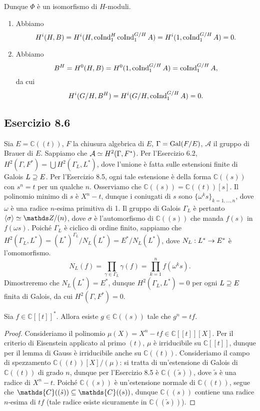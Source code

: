 \documentclass[a4paper]{article}
\newcommand*{\CC}{\mathds{C}}
\begin{document}
Dunque $\Phi$ è un isomorfismo di $H$-moduli.
\begin{enumerate}[(1)]
\item Abbiamo
$$
H^i(H,B)=H^i(H,\operatorname{coInd}_1^H\operatorname{coInd}_1^{G/H}A)=H^i(1,\operatorname{coInd}_1^{G/H}A)=0.
$$
\item Abbiamo
$$
B^H=H^0(H,B)=H^0(1,\operatorname{coInd}_1^{G/H}A)=\operatorname{coInd}_1^{G/H}A,
$$
da cui
$$
H^i(G/H,B^H)=H^i(G/H,\operatorname{coInd}_1^{G/H}A)=0.
$$
\end{enumerate}

\subsection*{Esercizio 8.6}
Sia $E=\CC((t))$, $F$ la chiusura algebrica di $E$, $\Gamma=\operatorname{Gal}(F/E)$, $\mathcal{A}$ il gruppo di Brauer di $E$. Sappiamo che $\mathcal{A}\simeq H^2(\Gamma,F^*)$. Per l'Esercizio 6.2, $H^2(\Gamma, F^*)=\bigcup H^2(\Gamma_L,L^*)$, dove l'unione è fatta sulle estensioni finite di Galois $L\supseteq E$. Per l'Esercizio 8.5, ogni tale estensione è della forma $\CC((s))$ con $s^n=t$ per un qualche $n$. Osserviamo che $\CC((s))=\CC((t))[s]$. Il polinomio minimo di $s$ è $X^n-t$, dunque i coniugati di $s$ sono $\{\omega^ks\}_{k=1,\ldots,n}$, dove $\omega$ è una radice $n$-esima primitiva di 1. Il gruppo di Galois $\Gamma_L$ è pertanto $\langle\sigma\rangle\iso\ZZ/(n)$, dove $\sigma$ è l'automorfismo di $\CC((s))$ che manda $f(s)$ in $f(\omega s)$. Poiché $\Gamma_L$ è ciclico di ordine finito, sappiamo che $H^2(\Gamma_L,L^*)=(L^*)^{\Gamma_L}/N_L(L^*)=E^*/N_L(L^*)$, dove $N_L:L^*\rightarrow E^*$ è l'omomorfismo.
$$
N_L(f)=\prod_{\gamma\in\Gamma_L}\gamma(f)=\prod_{k=1}^{n}f(\omega^ks).
$$
Dimostreremo che $N_L(L^*)=E^*$, dunque $H^2(\Gamma_L,L^*)=0$ per ogni $L\supseteq E$ finita di Galois, da cui $H^2(\Gamma,F^*)=0$.

\begin{lemma*}
Sia $f\in\CC[[t]]^*$. Allora esiste $g\in\CC((s))$ tale che $g^n=tf$.
\end{lemma*}
\begin{proof}
Consideriamo il polinomio $\mu(X)=X^n-tf\in\CC[[t]][X]$. Per il criterio di Eisenstein applicato al primo $(t)$, $\mu$ è irriducibile su $\CC[[t]]$, dunque per il lemma di Gauss è irriducibile anche su $\CC((t))$. Consideriamo il campo di spezzamento $\CC((t))[X]/(\mu)$: si tratta di un'estensione di Galois di $\CC((t))$ di grado $n$, dunque per l'Esercizio 8.5 è $\CC((\tilde{s}))$, dove $\tilde{s}$ è una radice di $X^n-t$. Poiché $\CC((s))$ è un'estensione normale di $\CC((t))$, segue che $\CC((\tilde{s}))\subs\CC((s))$, dunque $\CC((s))$ contiene una radice $n$-esima di $tf$ (tale radice esiste sicuramente in $\CC((\tilde{s}))$).
\end{proof}
\end{document}
